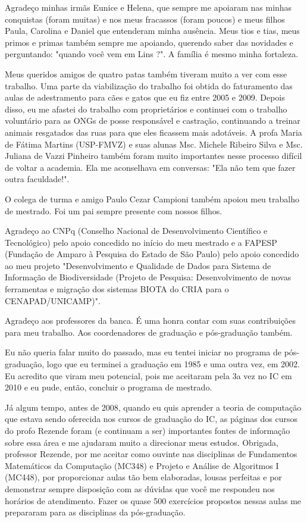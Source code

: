 Agradeço minhas irmãs Eunice e Helena, que sempre me apoiaram nas minhas conquistas (foram muitas) e nos meus fracassos (foram poucos) e meus filhos Paula, Carolina e Daniel que entenderam minha ausência. Meus tios e tias, meus primos e primas também sempre me apoiando, querendo saber das novidades e perguntando: "quando você vem em Lins ?". A família é mesmo minha fortaleza.

Meus queridos amigos de quatro patas também tiveram muito a ver com esse trabalho. Uma parte da viabilização do trabalho foi obtida do faturamento das aulas de adestramento para cães e gatos que eu fiz entre 2005 e 2009. Depois disso, eu me afastei do trabalho com proprietários e continuei com o trabalho voluntário para as ONGs de posse responsável e castração, continuando a treinar animais resgatados das ruas para que eles ficassem mais adotáveis. A profa Maria de Fátima Martins (USP-FMVZ) e suas alunas Msc. Michele Ribeiro Silva e Msc. Juliana de Vazzi Pinheiro também foram muito importantes nesse processo difícil de voltar a academia. Ela me aconselhava em conversas: "Ela não tem que fazer outra faculdade!".

O colega de turma e amigo Paulo Cezar Campioni também apoiou meu trabalho de mestrado. Foi um pai sempre presente com nossos filhos.

Agradeço ao CNPq (Conselho Nacional de Desenvolvimento Científico e Tecnológico) pelo apoio concedido no início do meu mestrado e a FAPESP (Fundação de Amparo à Pesquisa do Estado de São Paulo) pelo apoio concedido ao meu projeto "Desenvolvimento e Qualidade de Dados para Sistema de Informação de Biodiversidade (Projeto de Pesquisa: Desenvolvimento de novas ferramentas e migração dos sistemas BIOTA do CRIA para o CENAPAD/UNICAMP)".

Agradeço aos professores da banca. É uma honra contar com suas contribuições para meu trabalho. Aos coordenadores de graduação e pós-graduação também.

Eu não queria falar muito do passado, mas eu tentei iniciar no programa de pós-graduação, logo que eu terminei a graduação em 1985 e uma outra vez, em 2002. Eu acredito que viram meu potencial, pois me aceitaram pela 3a vez no IC em 2010 e eu pude, então, concluir o programa de mestrado.

Já algum tempo, antes de 2008, quando eu quis aprender a teoria de computação que estava sendo oferecida nos cursos de graduação do IC, as páginas dos cursos do profo Rezende foram (e continuam a ser) importantes fontes de informação sobre essa área e me ajudaram muito a direcionar meus estudos. Obrigada, professor Rezende, por me aceitar como ouvinte nas disciplinas de Fundamentos Matemáticos da Computação (MC348) e Projeto e Análise de Algoritmos I (MC448), por proporcionar aulas tão bem elaboradas, lousas perfeitas e por demonstrar sempre disposição com as dúvidas que você me respondeu nos horários de atendimento. Fazer os quase 500 exercícios propostos nessas aulas me prepararam para as disciplinas da pós-graduação.

